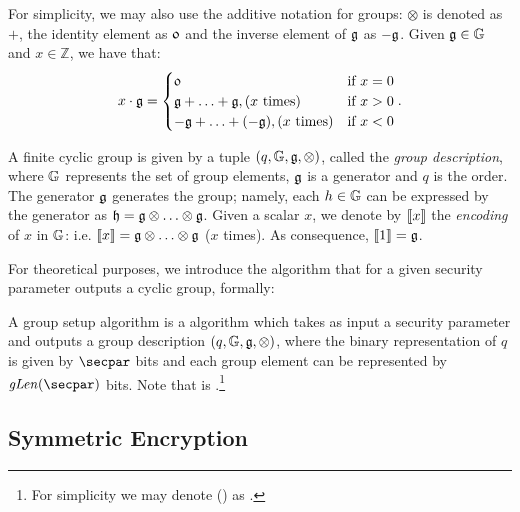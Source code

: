 For simplicity, we may also use the additive notation for groups: $\otimes$ is denoted as $+$, the identity element as $\mathfrak{0}$ and the inverse element of $\mathfrak{g}$ as $-\mathfrak{g}$. Given $\mathfrak{g} \in \mathbb{G}$ and $x \in \mathbb{Z}$, we have that:
\[x \cdot \mathfrak{g} =
\begin{cases}
    \mathfrak{0} & \mbox{if } x = 0\\
    \mathfrak{g} + \ldots + \mathfrak{g}, (x \mbox{ times}) & \mbox{if } x > 0 \\
    -\mathfrak{g} + \ldots + (-\mathfrak{g}), (x \mbox{ times}) & \mbox{if } x < 0
\end{cases}.
\]
\begin{definition}
    A finite cyclic group is given by a tuple $(q, \mathbb{G}, \mathfrak{g}, \otimes)$, called the \emph{group description}, where $\mathbb{G}$ represents the set of group elements, $\mathfrak{g}$ is a generator and $q$ is the order. The generator $\mathfrak{g}$ generates the group; namely, each $h \in \mathbb{G}$ can be expressed by the generator as $\mathfrak{h} = \mathfrak{g} \otimes \ldots \otimes \mathfrak{g} $.
    Given a scalar $x$, we denote by $\llbracket {x} \rrbracket$ the \emph{encoding} of $x$ in $\mathbb{G}$: i.e. $\llbracket {x} \rrbracket = \mathfrak{g} \otimes \ldots \otimes \mathfrak{g}$ ($x$ times). As consequence, $\llbracket {1} \rrbracket = \mathfrak{g}$.
\end{definition}

For theoretical purposes, we introduce the \groupSetup{} algorithm that for a given security parameter \secpar{} outputs a cyclic group, formally:
\begin{definition}
    A group setup algorithm \groupSetup{} is a \ppt{} algorithm which takes as input a security parameter \secparam{} and outputs a group description $(q, \mathbb{G}, \mathfrak{g}, \otimes)$, where the binary representation of $q$ is given by $\secpar$ bits and each group element can be represented by $\groupLen(\secpar)$ bits. Note that \groupLen{} is \poly.\footnote{For simplicity we may denote \groupLen(\secpar) as \groupLen{}.}
\end{definition}

\subsection{Symmetric Encryption}\label{preliminaries:definitions:sym-enc}


